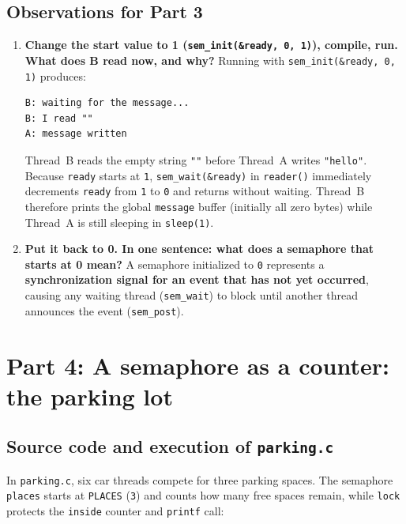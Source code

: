 \documentclass{../latex/utmreport}
\providecommand{\tightlist}{\setlength{\itemsep}{0pt}\setlength{\parskip}{0pt}}
\begin{document}
\section{Observations for Part 3}

\begin{enumerate}
\tightlist
\item \textbf{Change the start value to 1 (\texttt{sem\_init(\&ready, 0, 1)}), compile, run. What does B read now, and why?}
Running with \texttt{sem\_init(\&ready, 0, 1)} produces:
\begin{lstlisting}
B: waiting for the message...
B: I read ""
A: message written
\end{lstlisting}
Thread~B reads the empty string \texttt{""} before Thread~A writes \texttt{"hello"}. Because \texttt{ready} starts at \texttt{1}, \texttt{sem\_wait(\&ready)} in \texttt{reader()} immediately decrements \texttt{ready} from \texttt{1} to \texttt{0} and returns without waiting. Thread~B therefore prints the global \texttt{message} buffer (initially all zero bytes) while Thread~A is still sleeping in \texttt{sleep(1)}.

\item \textbf{Put it back to 0. In one sentence: what does a semaphore that starts at 0 mean?}
A semaphore initialized to \texttt{0} represents a \textbf{synchronization signal for an event that has not yet occurred}, causing any waiting thread (\texttt{sem\_wait}) to block until another thread announces the event (\texttt{sem\_post}).
\end{enumerate}

\chapter{Part 4: A semaphore as a counter: the parking lot}

\section{Source code and execution of \texttt{parking.c}}

In \texttt{parking.c}, six car threads compete for three parking spaces. The semaphore \texttt{places} starts at \texttt{PLACES} (\texttt{3}) and counts how many free spaces remain, while \texttt{lock} protects the \texttt{inside} counter and \texttt{printf} call:
\end{document}
